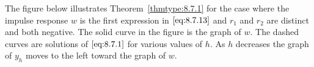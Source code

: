 \documentclass{ximera}
\begin{document}
The figure below %
illustrates Theorem~\ref{thmtype:8.7.1} for the
case where the impulse response $w$ is the first expression in
$\eqref{eq:8.7.13}$ and $r_1$ and $r_2$ are distinct and both negative. The
solid curve in the figure is the graph of $w$. The dashed curves are solutions of $\eqref{eq:8.7.1}$ for various values of $h$. As $h$ decreases
the graph of $y_h$ moves to the left toward the graph of $w$.

\begin{center}  
\end{center}



\end{document}
